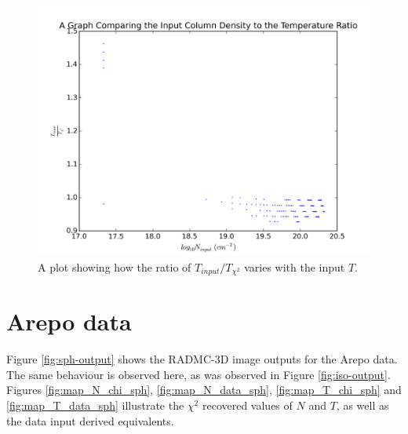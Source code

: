 \documentclass{report}
\begin{document}
\begin{figure}[H]
  \centering
  \includegraphics[width=0.5\linewidth]{../img/sim/T_ratio_inp.png}
  \caption{A plot showing how the ratio of $T_{input}/T_{\chi^{2}}$ varies with the input $T$.}\label{fig:T_ratio}
\end{figure}

\section{Arepo data} \label{sec:sph}

Figure \ref{fig:sph-output} shows the RADMC-3D image outputs for the Arepo data. The same behaviour is observed here, as was observed in Figure \ref{fig:iso-output}. Figures \ref{fig:map_N_chi_sph}, \ref{fig:map_N_data_sph},
\ref{fig:map_T_chi_sph} and \ref{fig:map_T_data_sph} illustrate the $\chi^{2}$ recovered values of $N$ and $T$, as well as the data input derived equivalents.
\end{document}
